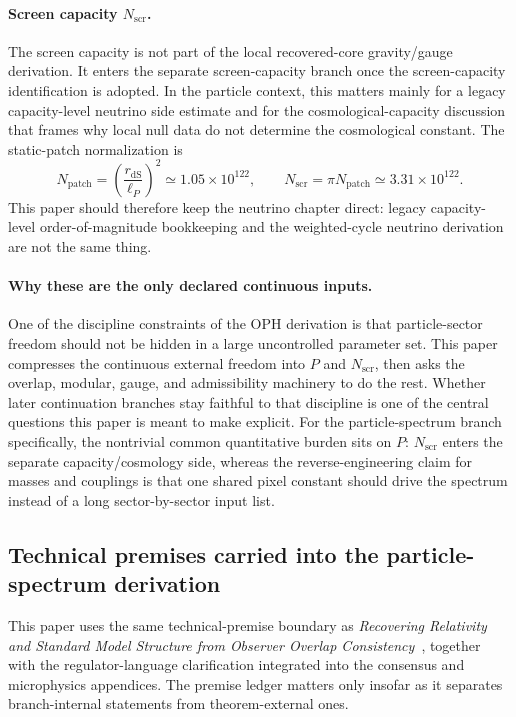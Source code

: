 \documentclass[11pt]{article}
\begin{document}
\paragraph{Screen capacity \(N_{\mathrm{scr}}\).}
The screen capacity is not part of the local recovered-core gravity/gauge derivation. It enters
the separate screen-capacity branch once the screen-capacity identification is adopted. In the
particle context, this matters mainly for a legacy capacity-level neutrino side estimate and for the
cosmological-capacity discussion that frames why local null data do not determine the
cosmological constant. The static-patch normalization is
\[
N_{\mathrm{patch}}=\left(\frac{r_{\mathrm{dS}}}{\ell_P}\right)^2\simeq1.05\times10^{122},
\qquad
N_{\mathrm{scr}}=\pi N_{\mathrm{patch}}\simeq3.31\times10^{122}.
\]
This paper should therefore keep the neutrino chapter direct:
legacy capacity-level order-of-magnitude bookkeeping and the weighted-cycle neutrino derivation are not the
same thing.

\paragraph{Why these are the only declared continuous inputs.}
One of the discipline constraints of the OPH derivation is that particle-sector freedom should not
be hidden in a large uncontrolled parameter set. This paper compresses the
continuous external freedom into \(P\) and \(N_{\mathrm{scr}}\), then asks the overlap,
modular, gauge, and admissibility machinery to do the rest. Whether later continuation branches
stay faithful to that discipline is one of the central questions this paper is meant to
make explicit. For the particle-spectrum branch specifically, the nontrivial common quantitative
burden sits on \(P\): \(N_{\mathrm{scr}}\) enters the separate capacity/cosmology side, whereas
the reverse-engineering claim for masses and couplings is that one shared pixel constant should
drive the spectrum instead of a long sector-by-sector input list.

\subsection{Technical premises carried into the particle-spectrum derivation}

This paper uses the same technical-premise boundary as
\emph{Recovering Relativity and Standard Model Structure from Observer Overlap Consistency}~\cite{ophcompact}, together with
the regulator-language clarification integrated into the consensus and microphysics
appendices. The premise ledger matters only
insofar as it separates branch-internal statements from theorem-external ones.
\end{document}
